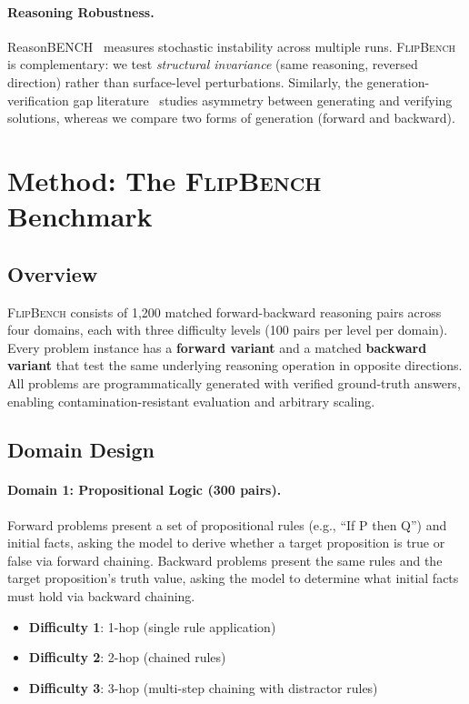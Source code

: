\documentclass{article}
\newcommand{\flipbench}{\textsc{FlipBench}\xspace}
\begin{document}
\paragraph{Reasoning Robustness.}
ReasonBENCH~\citep{wang2025reasonbench} measures stochastic instability across multiple runs. \flipbench is complementary: we test \emph{structural invariance} (same reasoning, reversed direction) rather than surface-level perturbations. Similarly, the generation-verification gap literature~\citep{yan2025variation} studies asymmetry between generating and verifying solutions, whereas we compare two forms of generation (forward and backward).

\section{Method: The \flipbench Benchmark}
\label{sec:method}

\subsection{Overview}

\flipbench consists of 1,200 matched forward-backward reasoning pairs across four domains, each with three difficulty levels (100 pairs per level per domain). Every problem instance has a \textbf{forward variant} and a matched \textbf{backward variant} that test the same underlying reasoning operation in opposite directions. All problems are programmatically generated with verified ground-truth answers, enabling contamination-resistant evaluation and arbitrary scaling.

\subsection{Domain Design}

\paragraph{Domain 1: Propositional Logic (300 pairs).}
Forward problems present a set of propositional rules (e.g., ``If P then Q'') and initial facts, asking the model to derive whether a target proposition is true or false via forward chaining. Backward problems present the same rules and the target proposition's truth value, asking the model to determine what initial facts must hold via backward chaining.
\begin{itemize}
    \item \textbf{Difficulty 1}: 1-hop (single rule application)
    \item \textbf{Difficulty 2}: 2-hop (chained rules)
    \item \textbf{Difficulty 3}: 3-hop (multi-step chaining with distractor rules)
\end{itemize}
\end{document}
